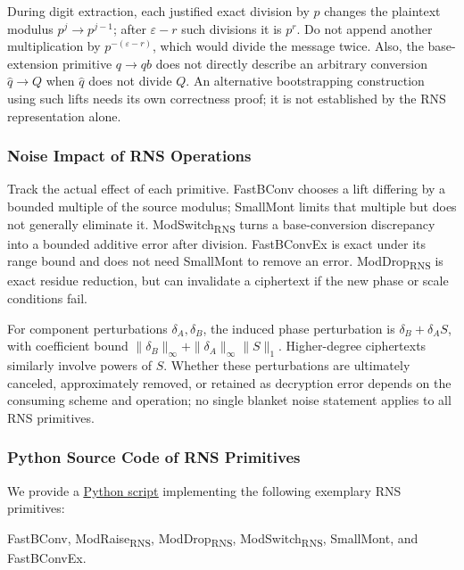 During digit extraction, each justified exact division by $p$ changes the plaintext modulus $p^j\rightarrow p^{j-1}$; after $\varepsilon-r$ such divisions it is $p^r$. Do not append another multiplication by $p^{-(\varepsilon-r)}$, which would divide the message twice. Also, the base-extension primitive $q\rightarrow qb$ does not directly describe an arbitrary conversion $\hat q\rightarrow Q$ when $\hat q$ does not divide $Q$. An alternative bootstrapping construction using such lifts needs its own correctness proof; it is not established by the RNS representation alone.


\subsubsection{Noise Impact of RNS Operations}
\label{subsubsec:rns-noise}

Track the actual effect of each primitive. \textsf{FastBConv} chooses a lift differing by a bounded multiple of the source modulus; \textsf{SmallMont} limits that multiple but does not generally eliminate it. \textsf{ModSwitch\textsubscript{RNS}} turns a base-conversion discrepancy into a bounded additive error after division. \textsf{FastBConvEx} is exact under its range bound and does not need \textsf{SmallMont} to remove an error. \textsf{ModDrop\textsubscript{RNS}} is exact residue reduction, but can invalidate a ciphertext if the new phase or scale conditions fail.

For component perturbations $\delta_A,\delta_B$, the induced phase perturbation is $\delta_B+\delta_AS$, with coefficient bound $\|\delta_B\|_\infty+\|\delta_A\|_\infty\|S\|_1$. Higher-degree ciphertexts similarly involve powers of $S$. Whether these perturbations are ultimately canceled, approximately removed, or retained as decryption error depends on the consuming scheme and operation; no single blanket noise statement applies to all RNS primitives.

\subsubsection{Python Source Code of RNS Primitives}
\label{subsubsec:rns-source-code}

We provide a \href{https://github.com/wang2000star/fhe-textbook-cn/blob/chinese-edition/source%20code/rns.py}{\underline{Python script}} implementing the following exemplary RNS primitives:

\noindent\textsf{FastBConv},
\textsf{ModRaise\textsubscript{RNS}},
\textsf{ModDrop\textsubscript{RNS}},
\textsf{ModSwitch\textsubscript{RNS}},
\textsf{SmallMont}, and
\textsf{FastBConvEx}.





